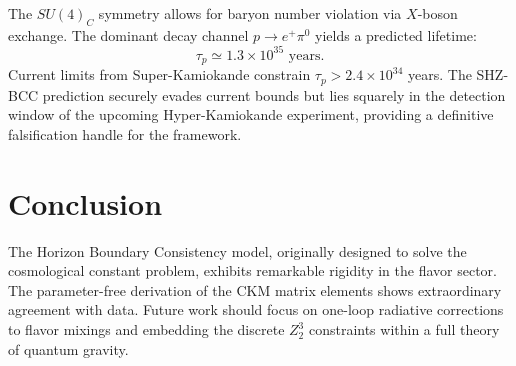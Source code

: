 \documentclass[11pt,a4paper]{article}
\begin{document}
The $SU(4)_C$ symmetry allows for baryon number violation via $X$-boson exchange. The dominant decay channel $p \to e^+ \pi^0$ yields a predicted lifetime:
\begin{equation}
    \tau_p \simeq 1.3 \times 10^{35} \text{ years}.
\end{equation}
Current limits from Super-Kamiokande constrain $\tau_p > 2.4 \times 10^{34}$ years. The SHZ-BCC prediction securely evades current bounds but lies squarely in the detection window of the upcoming Hyper-Kamiokande experiment, providing a definitive falsification handle for the framework.

\section{Conclusion}
The Horizon Boundary Consistency model, originally designed to solve the cosmological constant problem, exhibits remarkable rigidity in the flavor sector. The parameter-free derivation of the CKM matrix elements shows extraordinary agreement with data. Future work should focus on one-loop radiative corrections to flavor mixings and embedding the discrete $Z_2^3$ constraints within a full theory of quantum gravity.
\end{document}
